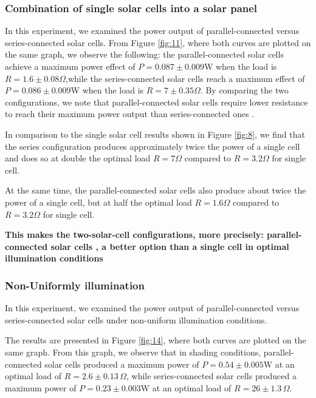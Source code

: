 \documentclass[12pt]{article}
\begin{document}
\subsubsection{Combination of single solar cells into a solar panel}

In this experiment, we examined the power output of parallel-connected versus series-connected solar cells.
From Figure \ref{fig:11}, where both curves are plotted on the same graph, we observe the following: the parallel-connected solar cells achieve a maximum power effect of \(P = 0.087 \pm 0.009 \)W when the load is \( R = 1.6 \pm 0.08\Omega \),while the series-connected solar cells reach a maximum effect  of \(P = 0.086\pm0.009 \)W when the load is \( R = 7\pm 0.35 \Omega \).
By comparing the two configurations, we note that parallel-connected solar cells require  lower resistance to reach their maximum power output than series-connected ones .
\newline

In comparison to the single solar cell results shown in Figure \ref{fig:8}, we find that the series configuration produces approximately twice the power of a single cell and does so at double the optimal load \(R = 7\Omega  \) compared to \(R = 3.2\Omega  \) for single cell.


At the same time, the parallel-connected solar cells also produce about twice the power of a single cell, but at half the optimal load \(R = 1.6\Omega \) compared to \(R = 3.2\Omega  \) for single cell.


\textbf{This makes the two-solar-cell configurations, more precisely: parallel-connected solar cells ,  a better option than a single cell in  optimal illumination conditions}

\subsubsection{Non-Uniformly illumination}

In this experiment, we examined the power output of parallel-connected versus series-connected solar cells under non-uniform illumination conditions.

The results are presented in Figure \ref{fig:14}, where both curves are plotted on the same graph. From this graph, we observe that in shading conditions, parallel-connected solar cells produced a maximum power  of \(P= 0.54 \pm 0.005 \text{W} \) at an optimal load of \( R = 2.6 \pm 0.13 \, \Omega \), while series-connected solar cells produced a maximum power  of  \( P=0.23\pm 0.003 \text{W} \) at an optimal load of \( R = 26\pm 1.3 \, \Omega \).
\end{document}
